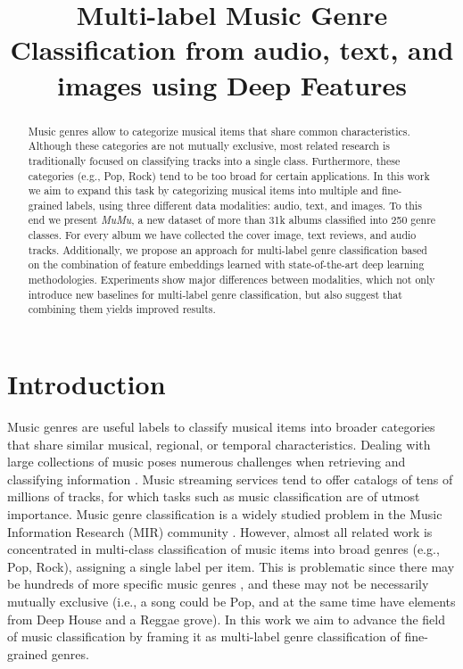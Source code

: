 \documentclass{article}
\title{Multi-label Music Genre Classification from audio, text, and images using Deep Features}
\begin{document}
\maketitle
\begin{abstract}
Music genres allow to categorize musical items that share common characteristics. Although these categories are not mutually exclusive, most related research is traditionally focused on classifying tracks into a single class. Furthermore, these categories (e.g., Pop, Rock) tend to be too broad for certain applications. In this work we aim to expand this task by categorizing musical items into multiple and fine-grained labels, using three different data modalities: audio, text, and images. To this end we present \textit{MuMu}, a new dataset of more than 31k albums classified into 250 genre classes. For every album we have collected the cover image, text reviews, and audio tracks. Additionally, we propose an approach for multi-label genre classification based on the combination of feature embeddings learned with state-of-the-art deep learning methodologies. Experiments show major differences between modalities, which not only introduce new baselines for multi-label genre classification, but also suggest that combining them yields improved results.

\end{abstract}


\section{Introduction}\label{sec:introduction}
Music genres are useful labels to classify musical items into broader categories that share similar musical, regional, or temporal characteristics. Dealing with large collections of music poses numerous challenges when retrieving and classifying information \cite{casey2008content}. 
Music streaming services tend to offer catalogs of tens of millions of tracks, for which tasks such as music classification are of utmost importance.
Music genre classification is a widely studied problem in the Music Information Research (MIR) community \cite{sturm2012survey}. 
However, almost all related work is concentrated in multi-class classification of music items into broad genres (e.g., Pop, Rock), assigning a single label per item. This is problematic since there may be hundreds of more specific music genres \cite{pachet2000taxonomy}, and these may not be necessarily mutually exclusive (i.e., a song could be Pop, and at the same time have elements from Deep House and a Reggae grove). 
In this work we aim to advance the field of music classification by framing it as multi-label genre classification of fine-grained genres.
\end{document}
